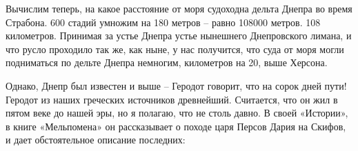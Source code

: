 Вычислим теперь, на какое расстояние от моря судоходна дельта Днепра во время Страбона. 600 стадий умножим на 180 метров – равно 108000 метров. 108 километров. Принимая за устье Днепра устье нынешнего Днепровского лимана, и что русло проходило так же, как ныне, у нас получится, что суда от моря могли подниматься по дельте Днепра  немногим, километров на 20, выше Херсона.


Однако, Днепр был известен и выше – Геродот говорит, что на сорок дней пути! Геродот из наших греческих источников древнейший. Считается, что он жил в пятом веке до нашей эры, но я полагаю, что не столь давно. В своей «Истории», в книге «Мельпомена» он рассказывает о походе царя Персов Дария на Скифов, и дает обстоятельное описание последних\cite{herodotus01}:

